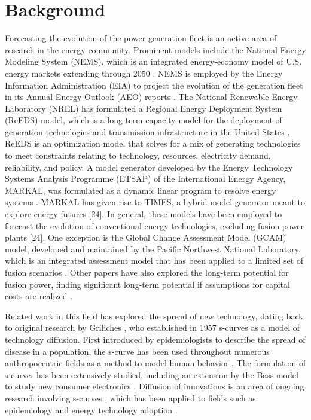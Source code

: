 \documentclass[review]{elsarticle}
\begin{document}
\section{Background}

Forecasting the evolution of the power generation fleet is an active area of research in the energy community. Prominent models include the National Energy Modeling System (NEMS), which is an integrated energy-economy model of U.S. energy markets extending through 2050 \citep{AEO2017}. NEMS is employed by the Energy Information Administration (EIA) to project the evolution of the generation fleet in its Annual Energy Outlook (AEO) reports \citep{NEMS2014}. The National Renewable Energy Laboratory (NREL) has formulated a Regional Energy Deployment System (ReEDS) model, which is a long-term capacity model for the deployment of generation technologies and transmission infrastructure in the United States \citep{ReDS2016}. ReEDS is an optimization model that solves for a mix of generating technologies to meet constraints relating to technology, resources, electricity demand, reliability, and policy. A model generator developed by the Energy Technology Systems Analysis Programme (ETSAP) of the International Energy Agency, MARKAL, was formulated as a dynamic linear program to resolve energy systems \citep{Fishbone2981}. MARKAL has given rise to TIMES, a hybrid model generator meant to explore energy futures [24]. In general, these models have been employed to forecast the evolution of conventional energy technologies, excluding fusion power plants [24]. One exception is the Global Change Assessment Model (GCAM) model, developed and maintained by the Pacific Northwest National Laboratory, which is an integrated assessment model that has been applied to a limited set of fusion scenarios \citep{Chou2016} \citep{ACFD}. Other papers have also explored the long-term potential for fusion power, finding significant long-term potential if assumptions for capital costs are realized \citep{Fishbone2981} \citep{Gnansounou2007} \citep{Han2009} \citep{Cook2002}.

Related work in this field has explored the spread of new technology, dating back to original research by Griliches \citep{Grilliches1957}, who established in 1957 s-curves as a model of technology diffusion. First introduced by epidemiologists to describe the spread of disease in a population, the s-curve has been used throughout numerous anthropocentric fields as a method to model human behavior \citep{Sovacool2016}. The formulation of s-curves has been extensively studied, including an extension by the Bass model to study new consumer electronics \citep{Bass1969}. Diffusion of innovations is an area of ongoing research involving s-curves \citep{Kijek2015}, which has been applied to fields such as epidemiology \citep{Wang2011} and energy technology adoption \citep{Schilling2008}.
\end{document}
